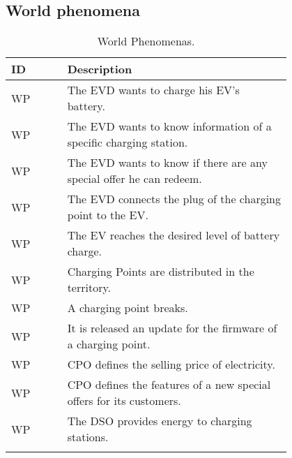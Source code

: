 \subsection{World phenomena}
\label{subsec:world_phenomena}%
\setcounter{wp}{1}
\newcommand{\cwp}{\thewp\stepcounter{wp}}
\begin{center}
    \begin{longtable}{ |l|p{0.8\linewidth}| }
        \hline
        \textbf{ID} & \textbf{Description}                                                \\
        \hline
        WP\cwp      & The EVD wants to charge his EV's battery.                           \\
        \hline
        WP\cwp      & The EVD wants to know information of a specific charging station.   \\
        \hline
        WP\cwp      & The EVD wants to know if there are any special offer he can redeem. \\
        \hline
        WP\cwp      & The EVD connects the plug of the charging point to the EV.          \\
        \hline
        WP\cwp      & The EV reaches the desired level of battery charge.                 \\
        \hline
        WP\cwp      & Charging Points are distributed in the territory.                   \\
        \hline
        WP\cwp      & A charging point breaks.                                            \\
        \hline
        WP\cwp      & It is released an update for the firmware of a charging point.      \\
        \hline
        WP\cwp      & CPO defines the selling price of electricity.                       \\
        \hline
        WP\cwp      & CPO defines the features of a new special offers for its customers. \\
        \hline
        WP\cwp      & The DSO provides energy to charging stations.                       \\
        \hline
        \caption{World Phenomenas.}
        \label{tab:worldph_tab}%
    \end{longtable}
\end{center}

